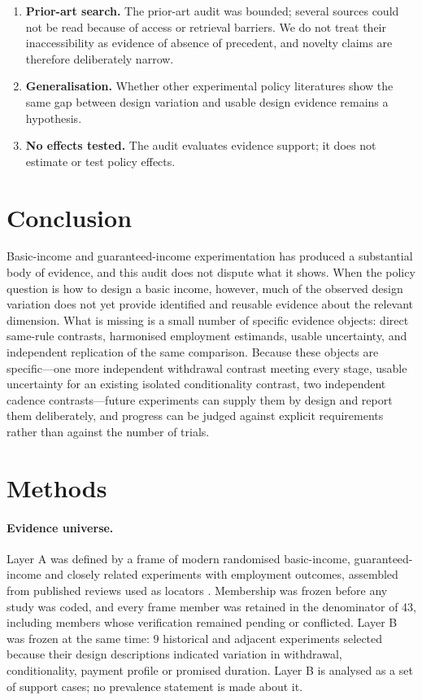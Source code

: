 \documentclass[11pt]{article}
\begin{document}
\begin{enumerate}
\item \textbf{Prior-art search.} The prior-art audit was bounded; several sources could not be read because of access or retrieval barriers. We do not treat their inaccessibility as evidence of absence of precedent, and novelty claims are therefore deliberately narrow.
\item \textbf{Generalisation.} Whether other experimental policy literatures show the same gap between design variation and usable design evidence remains a hypothesis.
\item \textbf{No effects tested.} The audit evaluates evidence support; it does not estimate or test policy effects.
\end{enumerate}

\section{Conclusion}

Basic-income and guaranteed-income experimentation has produced a substantial body of evidence, and this audit does not dispute what it shows. When the policy question is how to design a basic income, however, much of the observed design variation does not yet provide identified and reusable evidence about the relevant dimension. What is missing is a small number of specific evidence objects: direct same-rule contrasts, harmonised employment estimands, usable uncertainty, and independent replication of the same comparison. Because these objects are specific---one more independent withdrawal contrast meeting every stage, usable uncertainty for an existing isolated conditionality contrast, two independent cadence contrasts---future experiments can supply them by design and report them deliberately, and progress can be judged against explicit requirements rather than against the number of trials.

\section*{Methods}

\paragraph{Evidence universe.} Layer A was defined by a frame of modern randomised basic-income, guaranteed-income and closely related experiments with employment outcomes, assembled from published reviews used as locators \citep{chrisp2022,corinth2026}. Membership was frozen before any study was coded, and every frame member was retained in the denominator of 43, including members whose verification remained pending or conflicted. %
Layer B was frozen at the same time: 9 historical and adjacent experiments selected because their design descriptions indicated variation in withdrawal, conditionality, payment profile or promised duration. %
Layer B is analysed as a set of support cases; no prevalence statement is made about it.
\end{document}
